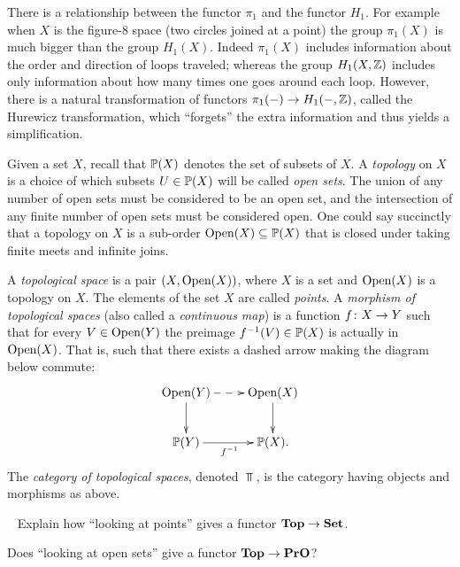 There is a relationship between the functor $\pi_1$ and the functor $H_1$. For example when $X$ is the figure-$8$ space (two circles joined at a point) the group $\pi_1(X)$ is much bigger than the group $H_1(X)$. Indeed $\pi_1(X)$ includes information about the order and direction of loops traveled; whereas the group $H_1(X,{\mathbb Z})$ includes only information about how many times one goes around each loop. However, there is a natural transformation of functors $\pi_1(-)\rightarrow H_1(-,{\mathbb Z})$, called the Hurewicz transformation, which “forgets” the extra information and thus yields a simplification. 

\begin{example}\label{ex:topological space}
Given a set $X$, recall that ${\mathbb P}(X)$ denotes the set of subsets of $X$. A {\em topology} on $X$ is a choice of which subsets $U\in{\mathbb P}(X)$ will be called {\em open sets}. The union of any number of open sets must be considered to be an open set, and the intersection of any finite number of open sets must be considered open. One could say succinctly that a topology on $X$ is a sub-order $\textnormal{Open}(X)\subseteq{\mathbb P}(X)$ that is closed under taking finite meets and infinite joins.

A {\em topological space} is a pair $(X,\textnormal{Open}(X))$, where $X$ is a set and $\textnormal{Open}(X)$ is a topology on $X$. The elements of the set $X$ are called {\em points}. A {\em morphism of topological spaces} (also called a {\em continuous map}) is a function $f\colon X\rightarrow Y$ such that for every $V\in\textnormal{Open}(Y)$ the preimage $f^\m1(V)\in\PP(X)$ is actually in $\textnormal{Open}(X)$. That is, such that there exists a dashed arrow making the diagram below commute:
$$\xymatrix{\Op(Y)\ar@{-->}[r]\ar[d]&\Op(X)\ar[d]\\\PP(Y)\ar[r]_{f^\m1}&\PP(X).}$$
The {\em category of topological spaces}, denoted $\Top$, is the category having objects and morphisms as above.

\end{example}

\begin{exercise}\label{exc:points and opens in Top}~
\sexc Explain how “looking at points” gives a functor ${\bf Top}\rightarrow{\bf Set}$.
\item Does “looking at open sets” give a functor ${\bf Top}\rightarrow{\bf PrO}$?
\endsexc
\end{exercise}

